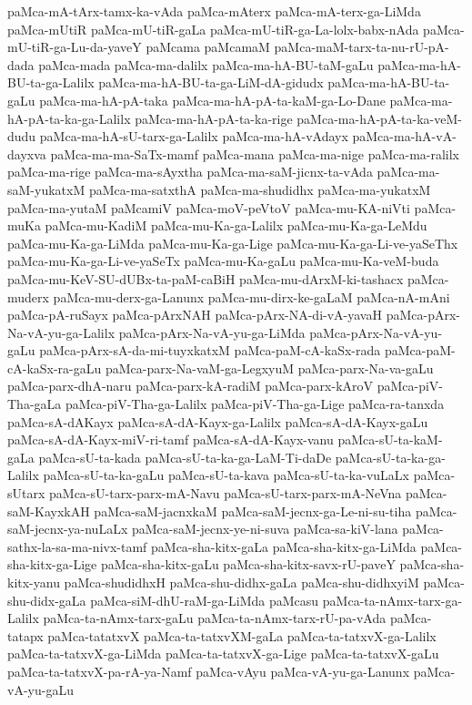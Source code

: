 {paMca-mA-tArx-tamx-ka-vAda
paMca-mAterx
paMca-mA-terx-ga-LiMda
paMca-mUtiR
paMca-mU-tiR-gaLa
paMca-mU-tiR-ga-La-lolx-babx-nAda
paMca-mU-tiR-ga-Lu-da-yaveY
paMcama
paMcamaM
paMca-maM-tarx-ta-nu-rU-pA-dada
paMca-mada
paMca-ma-dalilx
paMca-ma-hA-BU-taM-gaLu
paMca-ma-hA-BU-ta-ga-Lalilx
paMca-ma-hA-BU-ta-ga-LiM-dA-gidudx
paMca-ma-hA-BU-ta-gaLu
paMca-ma-hA-pA-taka
paMca-ma-hA-pA-ta-kaM-ga-Lo-Dane
paMca-ma-hA-pA-ta-ka-ga-Lalilx
paMca-ma-hA-pA-ta-ka-rige
paMca-ma-hA-pA-ta-ka-veM-dudu
paMca-ma-hA-sU-tarx-ga-Lalilx
paMca-ma-hA-vAdayx
paMca-ma-hA-vA-dayxva
paMca-ma-ma-SaTx-mamf
paMca-mana
paMca-ma-nige
paMca-ma-ralilx
paMca-ma-rige
paMca-ma-sAyxtha
paMca-ma-saM-jicnx-ta-vAda
paMca-ma-saM-yukatxM
paMca-ma-satxthA
paMca-ma-shudidhx
paMca-ma-yukatxM
paMca-ma-yutaM
paMcamiV
paMca-moV-peVtoV
paMca-mu-KA-niVti
paMca-muKa
paMca-mu-KadiM
paMca-mu-Ka-ga-Lalilx
paMca-mu-Ka-ga-LeMdu
paMca-mu-Ka-ga-LiMda
paMca-mu-Ka-ga-Lige
paMca-mu-Ka-ga-Li-ve-yaSeThx
paMca-mu-Ka-ga-Li-ve-yaSeTx
paMca-mu-Ka-gaLu
paMca-mu-Ka-veM-buda
paMca-mu-KeV-SU-dUBx-ta-paM-caBiH
paMca-mu-dArxM-ki-tashacx
paMca-muderx
paMca-mu-derx-ga-Lanunx
paMca-mu-dirx-ke-gaLaM
paMca-nA-mAni
paMca-pA-ruSayx
paMca-pArxNAH
paMca-pArx-NA-di-vA-yavaH
paMca-pArx-Na-vA-yu-ga-Lalilx
paMca-pArx-Na-vA-yu-ga-LiMda
paMca-pArx-Na-vA-yu-gaLu
paMca-pArx-sA-da-mi-tuyxkatxM
paMca-paM-cA-kaSx-rada
paMca-paM-cA-kaSx-ra-gaLu
paMca-parx-Na-vaM-ga-LegxyuM
paMca-parx-Na-va-gaLu
paMca-parx-dhA-naru
paMca-parx-kA-radiM
paMca-parx-kAroV
paMca-piV-Tha-gaLa
paMca-piV-Tha-ga-Lalilx
paMca-piV-Tha-ga-Lige
paMca-ra-tanxda
paMca-sA-dAKayx
paMca-sA-dA-Kayx-ga-Lalilx
paMca-sA-dA-Kayx-gaLu
paMca-sA-dA-Kayx-miV-ri-tamf
paMca-sA-dA-Kayx-vanu
paMca-sU-ta-kaM-gaLa
paMca-sU-ta-kada
paMca-sU-ta-ka-ga-LaM-Ti-daDe
paMca-sU-ta-ka-ga-Lalilx
paMca-sU-ta-ka-gaLu
paMca-sU-ta-kava
paMca-sU-ta-ka-vuLaLx
paMca-sUtarx
paMca-sU-tarx-parx-mA-Navu
paMca-sU-tarx-parx-mA-NeVna
paMca-saM-KayxkAH
paMca-saM-jacnxkaM
paMca-saM-jecnx-ga-Le-ni-su-tiha
paMca-saM-jecnx-ya-nuLaLx
paMca-saM-jecnx-ye-ni-suva
paMca-sa-kiV-lana
paMca-sathx-la-sa-ma-nivx-tamf
paMca-sha-kitx-gaLa
paMca-sha-kitx-ga-LiMda
paMca-sha-kitx-ga-Lige
paMca-sha-kitx-gaLu
paMca-sha-kitx-savx-rU-paveY
paMca-sha-kitx-yanu
paMca-shudidhxH
paMca-shu-didhx-gaLa
paMca-shu-didhxyiM
paMca-shu-didx-gaLa
paMca-siM-dhU-raM-ga-LiMda
paMcasu
paMca-ta-nAmx-tarx-ga-Lalilx
paMca-ta-nAmx-tarx-gaLu
paMca-ta-nAmx-tarx-rU-pa-vAda
paMca-tatapx
paMca-tatatxvX
paMca-ta-tatxvXM-gaLa
paMca-ta-tatxvX-ga-Lalilx
paMca-ta-tatxvX-ga-LiMda
paMca-ta-tatxvX-ga-Lige
paMca-ta-tatxvX-gaLu
paMca-ta-tatxvX-pa-rA-ya-Namf
paMca-vAyu
paMca-vA-yu-ga-Lanunx
paMca-vA-yu-gaLu
}
